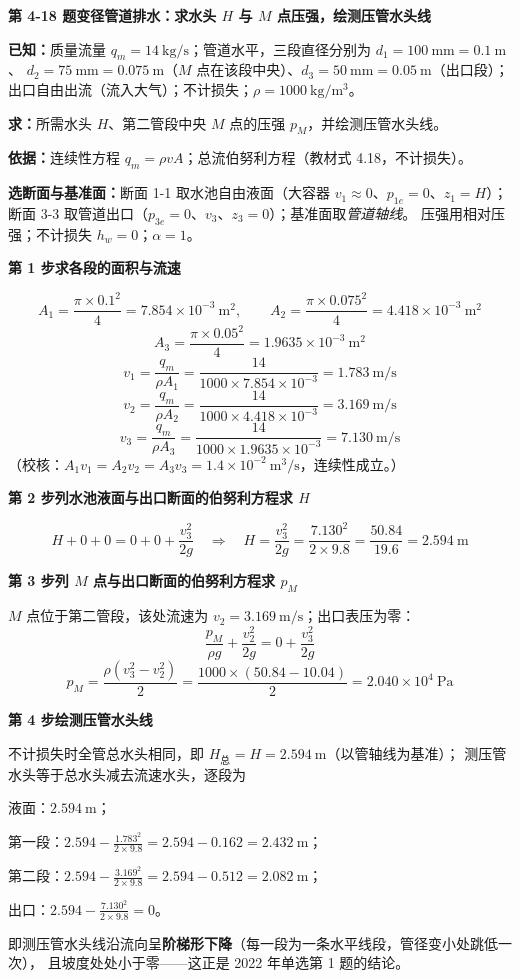 \noindent\textbf{第 4-18 题\quad 变径管道排水：求水头 $H$ 与 $M$ 点压强，绘测压管水头线}

\begin{jie}
\textbf{已知：}质量流量 $q_m=14\ \mathrm{kg/s}$；管道水平，三段直径分别为 $d_1=100\ \mathrm{mm}=0.1\ \mathrm{m}$、
$d_2=75\ \mathrm{mm}=0.075\ \mathrm{m}$（$M$ 点在该段中央）、$d_3=50\ \mathrm{mm}=0.05\ \mathrm{m}$（出口段）；
出口自由出流（流入大气）；不计损失；$\rho=1000\ \mathrm{kg/m^3}$。

\textbf{求：}所需水头 $H$、第二管段中央 $M$ 点的压强 $p_M$，并绘测压管水头线。

\textbf{依据：}连续性方程 $q_m=\rho vA$；总流伯努利方程（教材式 4.18，不计损失）。

\textbf{选断面与基准面：}断面 1-1 取水池自由液面（大容器 $v_1\approx0$、$p_{1e}=0$、$z_1=H$）；
断面 3-3 取管道出口（$p_{3e}=0$、$v_3$、$z_3=0$）；基准面取\emph{管道轴线}。
压强用相对压强；不计损失 $h_w=0$；$\alpha=1$。

\textbf{第 1 步\quad 求各段的面积与流速}

\[ A_1=\frac{\pi\times0.1^2}{4}=7.854\times10^{-3}\ \mathrm{m^2},\qquad
   A_2=\frac{\pi\times0.075^2}{4}=4.418\times10^{-3}\ \mathrm{m^2} \]
\[ A_3=\frac{\pi\times0.05^2}{4}=1.9635\times10^{-3}\ \mathrm{m^2} \]
\[ v_1=\frac{q_m}{\rho A_1}=\frac{14}{1000\times7.854\times10^{-3}}=1.783\ \mathrm{m/s} \]
\[ v_2=\frac{q_m}{\rho A_2}=\frac{14}{1000\times4.418\times10^{-3}}=3.169\ \mathrm{m/s} \]
\[ v_3=\frac{q_m}{\rho A_3}=\frac{14}{1000\times1.9635\times10^{-3}}=7.130\ \mathrm{m/s} \]
（校核：$A_1v_1=A_2v_2=A_3v_3=1.4\times10^{-2}\ \mathrm{m^3/s}$，连续性成立。）

\textbf{第 2 步\quad 列水池液面与出口断面的伯努利方程求 $H$}

\[ H+0+0=0+0+\frac{v_3^2}{2g}
   \quad\Longrightarrow\quad
   H=\frac{v_3^2}{2g}=\frac{7.130^2}{2\times9.8}=\frac{50.84}{19.6}=2.594\ \mathrm{m} \]

\textbf{第 3 步\quad 列 $M$ 点与出口断面的伯努利方程求 $p_M$}

$M$ 点位于第二管段，该处流速为 $v_2=3.169\ \mathrm{m/s}$；出口表压为零：
\[ \frac{p_M}{\rho g}+\frac{v_2^2}{2g}=0+\frac{v_3^2}{2g} \]
\[ p_M=\frac{\rho\left(v_3^2-v_2^2\right)}{2}=\frac{1000\times\left(50.84-10.04\right)}{2}=2.040\times10^4\ \mathrm{Pa} \]

\textbf{第 4 步\quad 绘测压管水头线}

不计损失时全管总水头相同，即 $H_{\text{总}}=H=2.594\ \mathrm{m}$（以管轴线为基准）；
测压管水头等于总水头减去流速水头，逐段为
\begin{xiaowen}
\item 液面：$2.594\ \mathrm{m}$；
\item 第一段：$2.594-\frac{1.783^2}{2\times9.8}=2.594-0.162=2.432\ \mathrm{m}$；
\item 第二段：$2.594-\frac{3.169^2}{2\times9.8}=2.594-0.512=2.082\ \mathrm{m}$；
\item 出口：$2.594-\frac{7.130^2}{2\times9.8}=0$。
\end{xiaowen}
即测压管水头线沿流向呈\textbf{阶梯形下降}（每一段为一条水平线段，管径变小处跳低一次），
且坡度处处小于零——这正是 2022 年单选第 1 题的结论。


\end{jie}
